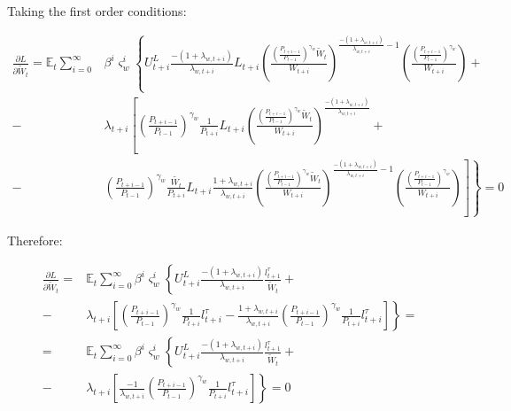 \documentclass{pracamgr}
\numberwithin{equation}{section}
\begin{document}
Taking the first order conditions:

\begin{align}
\frac{\partial L}{\partial \widetilde{W}_{t}}  =  \mathbb{E}_{t} \sum\limits_{i=0}^{\infty} &\beta^{i} \varsigma_{w}^{i}  \left\{ U_{t+i}^{L} {\frac{-(1+\lambda_{w,t+i})}{\lambda_{w,t+i}}} L_{t+i} \left( \frac{\left( \frac{P_{t+i-1}}{P_{t-1}} \right)^{\gamma_{w}} \widetilde{W}_{t}}{W_{t+i}}\right)^{\frac{-(1+\lambda_{w,t+i})}{\lambda_{w,t+i}}-1} \left( \frac{\left( \frac{P_{t+i-1}}{P_{t-1}} \right)^{\gamma_{w}}}{W_{t+i}}\right)  \right. + \nonumber \\ 
-  &\lambda_{t+i} \left[ \left( \frac{P_{t+i-1}}{P_{t-1}} \right)^{\gamma_{w}} \frac{1}{P_{t+i}} L_{t+i} \left( \frac{\left( \frac{P_{t+i-1}}{P_{t-1}} \right)^{\gamma_{w}} \widetilde{W}_{t}}{W_{t+i}}\right)^{\frac{-(1+\lambda_{w,t+i})}{\lambda_{w,t+i}}} \right. + \nonumber \\ 
-  &\left. \left. \left( \frac{P_{t+i-1}}{P_{t-1}} \right)^{\gamma_{w}} \frac{\widetilde{W_{t}}}{P_{t+i}} L_{t+i} {\frac{1+\lambda_{w,t+i}}{\lambda_{w,t+i}}} \left( \frac{\left( \frac{P_{t+i-1}}{P_{t-1}} \right)^{\gamma_{w}} \widetilde{W}_{t}}{W_{t+i}}\right)^{\frac{-(1+\lambda_{w,t+i})}{\lambda_{w,t+i}}-1} \left( \frac{\left( \frac{P_{t+i-1}}{P_{t-1}} \right)^{\gamma_{w}}}{W_{t+i}}\right) \right] \right\} = 0
\end{align}

Therefore:

\begin{align}
\frac{\partial L}{\partial \widetilde{W}_{t}} = &\mathbb{E}_{t} \sum\limits_{i=0}^{\infty} \beta^{i} \varsigma_{w}^{i}  \left\{ U_{t+i}^{L} {\frac{-(1+\lambda_{w,t+i})}{\lambda_{w,t+i}}} \frac{l_{t+1}^{\tau}}{\widetilde{W}_{t}}  \right. + \nonumber \\ 
- &\lambda_{t+i} \left. \left[ \left( \frac{P_{t+i-1}}{P_{t-1}} \right)^{\gamma_{w}} \frac{1}{P_{t+i}} l_{t+i}^{\tau} - {\frac{1+\lambda_{w,t+i}}{\lambda_{w,t+i}}} \left( \frac{P_{t+i-1}}{P_{t-1}} \right)^{\gamma_{w}} \frac{1}{P_{t+i}} l_{t+i}^{\tau} \right] \right\} = \nonumber \\ 
= &\mathbb{E}_{t} \sum\limits_{i=0}^{\infty} \beta^{i} \varsigma_{w}^{i}  \left\{ U_{t+i}^{L} {\frac{-(1+\lambda_{w,t+i})}{\lambda_{w,t+i}}} \frac{l_{t+1}^{\tau}}{\widetilde{W}_{t}}  \right. + \nonumber \\ 
- &\lambda_{t+i} \left. \left[ {\frac{-1}{\lambda_{w,t+i}}} \left( \frac{P_{t+i-1}}{P_{t-1}} \right)^{\gamma_{w}} \frac{1}{P_{t+i}} l_{t+i}^{\tau} \right] \right\} = 0
\end{align}
\end{document}
